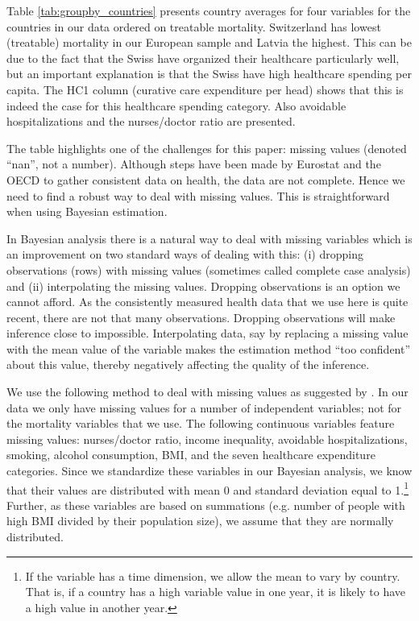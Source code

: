 \documentclass[a4paper,12pt]{article}
\begin{document}
Table \ref{tab:groupby_countries} presents country averages for four variables for the countries in our data ordered on treatable mortality. Switzerland has lowest (treatable) mortality in our European sample and Latvia the highest. This can be due to the fact that the Swiss have organized their healthcare particularly well, but an important explanation is that the Swiss have high healthcare spending per capita. The HC1 column (curative care expenditure per head) shows that this is indeed the case for this healthcare spending category. Also  avoidable hospitalizations and the nurses/doctor ratio are presented.

The table highlights one of the challenges for this paper: missing values (denoted ``nan'', not a number). Although steps have been made by Eurostat and the OECD to gather consistent data on health, the data are not complete. Hence we need to find a robust way to deal with missing values. This is straightforward when using Bayesian estimation.

In Bayesian analysis there is a natural way to deal with missing variables which is an improvement on two standard ways of dealing with this: (i) dropping observations (rows) with missing values (sometimes called complete case analysis) and (ii) interpolating the missing values. Dropping observations is an option we cannot afford. As the consistently measured health data that we use here is quite recent, there are not that many observations. Dropping observations will make inference close to impossible. Interpolating data, say by replacing a missing value with the mean value of the variable makes the estimation method ``too confident'' about this value, thereby negatively affecting the quality of the inference.

We use the following method to deal with missing values as suggested by \cite{mcelreath}. In our data we only have missing values for a number of independent variables; not for the mortality variables that we use. The following continuous variables feature missing values: nurses/doctor ratio, income inequality, avoidable hospitalizations, smoking, alcohol consumption, BMI, and the seven healthcare expenditure categories. Since we standardize these variables in our Bayesian analysis, we know that their values are distributed with mean 0 and standard deviation equal to 1.\footnote{If the variable has a time dimension, we allow the mean to vary by country. That is, if a country has a high variable value in one year, it is likely to have a high value in another year.} Further, as these variables are based on summations (e.g. number of people with high BMI divided by their population size), we assume that they are normally distributed.
\end{document}
